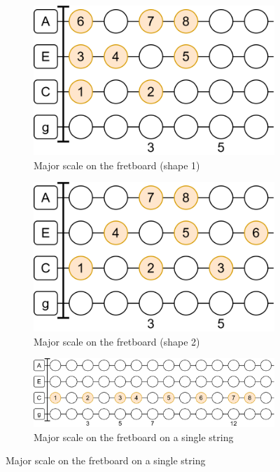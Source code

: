 \begin{figure}[h]
	\begin{subfigure}[b]{0.45\textwidth}
		\centering
		\includegraphics[width=\textwidth]{../../Images/ukulele_major_scale_compact.png}
		\caption{Major scale on the fretboard (shape 1)}
		\label{fig:ukulele_major_scale_fretboard_compact}
	\end{subfigure}
	\hfill
	\begin{subfigure}[b]{0.45\textwidth}
		\centering
		\includegraphics[width=\textwidth]{../../Images/ukulele_major_scale.png}
		\caption{Major scale on the fretboard (shape 2)}
		\label{fig:ukulele_major_scale_fretboard_alt}
	\end{subfigure}
	
	\vspace{0.5cm}
	\begin{subfigure}[b]{\textwidth}
		\centering
		\includegraphics[width=\textwidth]{../../Images/ukulele_major_scale_single_string.png}
		\caption{Major scale on the fretboard on a single string}
		\label{fig:ukulele_major_scale_fretboard_single_string}
	\end{subfigure}
	

\end{figure}
